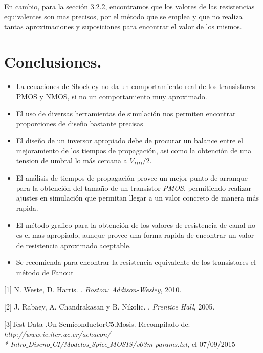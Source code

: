 \documentclass[12pt,a4paper]{article} %
\begin{document}
En cambio, para la sección 3.2.2, encontramos que los valores de las resistencias equivalentes son mas precisos, por el método que se emplea y que no realiza tantas aproximaciones y suposiciones para encontrar el valor de los mismos.


\section{Conclusiones.}
\begin{itemize}
\item La ecuaciones de Shockley no da un comportamiento real de los transistores PMOS y NMOS, si no un comportamiento muy aproximado.
\item El uso de diversas herramientas de simulación nos permiten encontrar proporciones de diseño bastante precisas
\item El diseño de un inversor apropiado debe de procurar un balance entre el mejoramiento de los tiempos de propagación, asi como la obtención de una tension de umbral lo más cercana a $\textit{V}_\textit{DD}/2$.
\item El análisis de tiempos de propagación provee un mejor punto de arranque para la obtención del tamaño de un transistor \textit{PMOS}, permitiendo realizar ajustes en simulación que permitan llegar a un valor concreto de manera más rapida.
\item El método grafico para la obtención de los valores de resistencia de canal no es el mas apropiado, aunque provee una forma rapida de encontrar un valor de resistencia aproximado aceptable.
\item Se recomienda para encontrar la resistencia equivalente de los transistores el método de Fanout
\end{itemize}

\begin{thebibliography}{3}


[1] N. Weste, D. Harris. 
.
\newblock \emph{Boston: Addison-Wesley}, 2010.

[2] J. Rabaey, A. Chandrakasan y B. Nikolic. 
.
\newblock \emph{Prentice Hall}, 2005.

[3]Test Data .On SemiconductorC5.Mosis. Recompilado de:
\newblock \emph{http://www.ie.itcr.ac.cr/achacon/ \\* Intro$\_$Diseno$\_$CI/Modelos$\_$Spice$\_$MOSIS/v03m-params.txt}, el 07/09/2015

\end{thebibliography}
\end{document}
